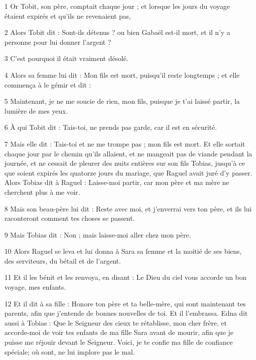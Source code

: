 \par 1 Or Tobit, son père, comptait chaque jour ; et lorsque les jours du voyage étaient expirés et qu'ils ne revenaient pas,
\par 2 Alors Tobit dit : Sont-ils détenus ? ou bien Gabaël est-il mort, et il n'y a personne pour lui donner l'argent ?
\par 3 C'est pourquoi il était vraiment désolé.
\par 4 Alors sa femme lui dit : Mon fils est mort, puisqu'il reste longtemps ; et elle commença à le gémir et dit :
\par 5 Maintenant, je ne me soucie de rien, mon fils, puisque je t'ai laissé partir, la lumière de mes yeux.
\par 6 À qui Tobit dit : Tais-toi, ne prends pas garde, car il est en sécurité.
\par 7 Mais elle dit : Tais-toi et ne me trompe pas ; mon fils est mort. Et elle sortait chaque jour par le chemin qu'ils allaient, et ne mangeait pas de viande pendant la journée, et ne cessait de pleurer des nuits entières sur son fils Tobias, jusqu'à ce que soient expirés les quatorze jours du mariage, que Raguel avait juré d'y passer. Alors Tobias dit à Raguel : Laisse-moi partir, car mon père et ma mère ne cherchent plus à me voir.
\par 8 Mais son beau-père lui dit : Reste avec moi, et j'enverrai vers ton père, et ils lui raconteront comment tes choses se passent.
\par 9 Mais Tobias dit : Non ; mais laisse-moi aller chez mon père.
\par 10 Alors Raguel se leva et lui donna à Sara sa femme et la moitié de ses biens, des serviteurs, du bétail et de l'argent.
\par 11 Et il les bénit et les renvoya, en disant : Le Dieu du ciel vous accorde un bon voyage, mes enfants.
\par 12 Et il dit à sa fille : Honore ton père et ta belle-mère, qui sont maintenant tes parents, afin que j'entende de bonnes nouvelles de toi. Et il l'embrassa. Edna dit aussi à Tobias : Que le Seigneur des cieux te rétablisse, mon cher frère, et accorde-moi de voir tes enfants de ma fille Sara avant de mourir, afin que je puisse me réjouir devant le Seigneur. Voici, je te confie ma fille de confiance spéciale; où sont, ne lui implore pas le mal.


